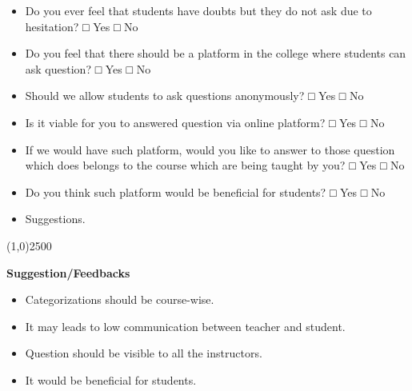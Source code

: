 \documentclass[12pt]{article}
\begin{document}
\begin{itemize}
    \item Do you ever feel that students have doubts but they do not ask due to hesitation?
    \subitem □ Yes
    \subitem □ No
    
\item Do you feel that there should be a platform in the college where students can ask
question?
\subitem □ Yes
\subitem □ No
\item Should we allow students to ask questions anonymously?
\subitem □ Yes
\subitem □ No
\item  Is it viable for you to answered question via online platform?
\subitem □ Yes
\subitem □ No
\item If we would have such platform, would you like to answer to those question which does belongs to the course which are being taught by you?
\subitem □ Yes
\subitem □ No
\item Do you think such platform would be beneficial for students?
\subitem □ Yes
\subitem □ No 

\item Suggestions. 
\vspace{2cm}
\end{itemize}

\begin{center}
\line(1,0){2500}
\end{center}

\textbf{Suggestion/Feedbacks}
\begin{itemize}
    
\item Categorizations should be course-wise.
\item  It may leads to low communication between teacher and student.
\item  Question should be visible to all the instructors.
\item  It would be beneficial for students. 
\end{itemize}
\end{document}
